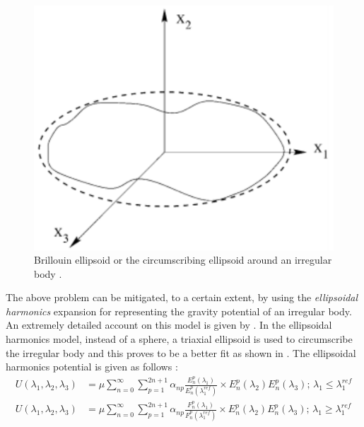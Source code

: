 \begin{figure}[htb]
\centering
\captionsetup{justification=centering}
\includegraphics[width=\textwidth, height=0.25\textheight, keepaspectratio=true]{Brillouin_ellipsoid.pdf}
\caption{Brillouin ellipsoid or the circumscribing ellipsoid around an irregular body \parencite{romain2001ellipsoidal}.}
\label{fig:brillouin_ellipsoid}
\end{figure}
\FloatBarrier
The above problem can be mitigated, to a certain extent, by using the \textit{ellipsoidal harmonics} expansion for representing the gravity potential of an irregular body. An extremely detailed account on this model is given by \cite{dechambre2002transformation}. In the ellipsoidal harmonics model, instead of a sphere, a triaxial ellipsoid is used to circumscribe the irregular body and this proves to be a better fit as shown in . The ellipsoidal harmonics potential is given as follows \parencite{dechambre2002transformation}:
\begin{align}
    U(\lambda_1, \lambda_2, \lambda_3) &= \mu \sum_{n=0}^{\infty} \sum_{p=1}^{2n+1} \alpha_{np} \frac{E_n^p(\lambda_1)}{E_n^p(\lambda_1^{ref})} \times E_n^p(\lambda_2) E_n^p(\lambda_3) \text{; $\lambda_1 \leq \lambda_1^{ref}$}
    \label{eqn:ellipsoidal_harmonics_inside} \\
    U(\lambda_1, \lambda_2, \lambda_3) &= \mu \sum_{n=0}^{\infty} \sum_{p=1}^{2n+1} \alpha_{np} \frac{F_n^p(\lambda_1)}{F_n^p(\lambda_1^{ref})} \times E_n^p(\lambda_2) E_n^p(\lambda_3) \text{; $\lambda_1 \geq \lambda_1^{ref}$}
    \label{eqn:ellipsoidal_harmonics_outside}
\end{align}
